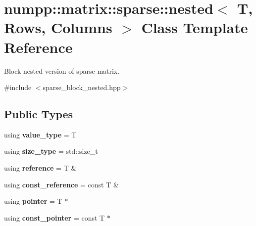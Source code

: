 \hypertarget{classnumpp_1_1matrix_1_1sparse_1_1nested}{}\section{numpp\+:\+:matrix\+:\+:sparse\+:\+:nested$<$ T, Rows, Columns $>$ Class Template Reference}
\label{classnumpp_1_1matrix_1_1sparse_1_1nested}


Block nested version of sparse matrix.  




{\ttfamily \#include $<$sparse\+\_\+block\+\_\+nested.\+hpp$>$}

\subsection*{Public Types}
\begin{DoxyCompactItemize}
\item 
\mbox{\label{classnumpp_1_1matrix_1_1sparse_1_1nested_a7ee7220e8a4fb147645e5e041d5e5bec}} 
using {\bfseries value\+\_\+type} = T
\item 
\mbox{\label{classnumpp_1_1matrix_1_1sparse_1_1nested_ae6ff817777e93a23739de12daaff86ca}} 
using {\bfseries size\+\_\+type} = std\+::size\+\_\+t
\item 
\mbox{\label{classnumpp_1_1matrix_1_1sparse_1_1nested_ad9b24c32e0151135d3bf17a17109dc36}} 
using {\bfseries reference} = T \&
\item 
\mbox{\label{classnumpp_1_1matrix_1_1sparse_1_1nested_a1d0a0d4ab6c821ba46b43c4b96358da3}} 
using {\bfseries const\+\_\+reference} = const T \&
\item 
\mbox{\label{classnumpp_1_1matrix_1_1sparse_1_1nested_ad93736ab4b7e04a671a5c2a1606129ee}} 
using {\bfseries pointer} = T $\ast$
\item 
\mbox{\label{classnumpp_1_1matrix_1_1sparse_1_1nested_aa940950e23a925cc7deb8911ec803f47}} 
using {\bfseries const\+\_\+pointer} = const T $\ast$
\end{DoxyCompactItemize}
